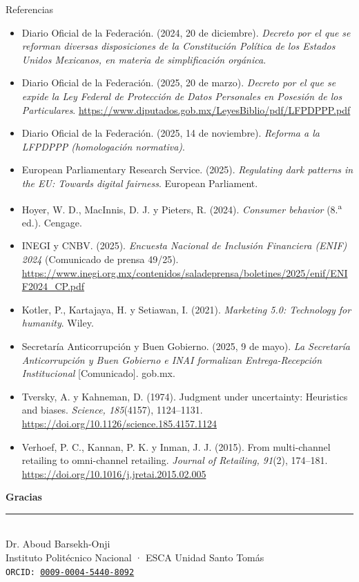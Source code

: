 \documentclass[aspectratio=169,xcolor=dvipsnames]{beamer}
\begin{document}
\begin{frame}{Referencias}
\tiny
\begin{itemize}
  \item[] Diario Oficial de la Federación. (2024, 20 de diciembre). \textit{Decreto por el que se reforman diversas disposiciones de la Constitución Política de los Estados Unidos Mexicanos, en materia de simplificación orgánica}.
  \item[] Diario Oficial de la Federación. (2025, 20 de marzo). \textit{Decreto por el que se expide la Ley Federal de Protección de Datos Personales en Posesión de los Particulares}. \url{https://www.diputados.gob.mx/LeyesBiblio/pdf/LFPDPPP.pdf}
  \item[] Diario Oficial de la Federación. (2025, 14 de noviembre). \textit{Reforma a la LFPDPPP (homologación normativa)}.
  \item[] European Parliamentary Research Service. (2025). \textit{Regulating dark patterns in the EU: Towards digital fairness}. European Parliament.
  \item[] Hoyer, W. D., MacInnis, D. J. y Pieters, R. (2024). \textit{Consumer behavior} (8.\textsuperscript{a} ed.). Cengage.
  \item[] INEGI y CNBV. (2025). \textit{Encuesta Nacional de Inclusión Financiera (ENIF) 2024} (Comunicado de prensa 49/25). \url{https://www.inegi.org.mx/contenidos/saladeprensa/boletines/2025/enif/ENIF2024_CP.pdf}
  \item[] Kotler, P., Kartajaya, H. y Setiawan, I. (2021). \textit{Marketing 5.0: Technology for humanity}. Wiley.
  \item[] Secretaría Anticorrupción y Buen Gobierno. (2025, 9 de mayo). \textit{La Secretaría Anticorrupción y Buen Gobierno e INAI formalizan Entrega-Recepción Institucional} [Comunicado]. gob.mx.
  \item[] Tversky, A. y Kahneman, D. (1974). Judgment under uncertainty: Heuristics and biases. \textit{Science, 185}(4157), 1124--1131. \url{https://doi.org/10.1126/science.185.4157.1124}
  \item[] Verhoef, P. C., Kannan, P. K. y Inman, J. J. (2015). From multi-channel retailing to omni-channel retailing. \textit{Journal of Retailing, 91}(2), 174--181. \url{https://doi.org/10.1016/j.jretai.2015.02.005}
\end{itemize}
\end{frame}

\begin{frame}
    \begin{center}
        {\Large \textcolor{IPNguinda}{\textbf{Gracias}}}\\[6pt]
        {\color{IPNdorado}\rule{0.4\linewidth}{1.2pt}}\\[6pt]
        Dr. Aboud Barsekh-Onji \\
        \small Instituto Politécnico Nacional · ESCA Unidad Santo Tomás \\
        \small \texttt{ORCID: \href{https://orcid.org/0009-0004-5440-8092}{0009-0004-5440-8092}}
    \end{center}
\end{frame}
\end{document}
